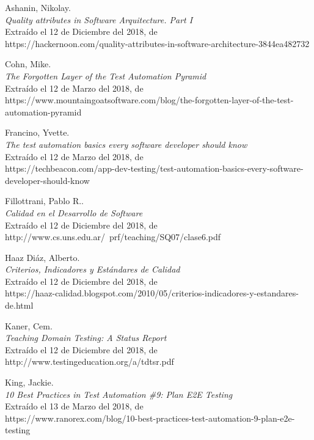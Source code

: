 \begin{thebibliography}{99}

 Ashanin, Nikolay.\\ %
\emph{Quality attributes in Software Arquitecture. Part I}\\
Extraído el 12 de Diciembre del 2018, de\\
https://hackernoon.com/quality-attributes-in-software-architecture-3844ea482732

 Cohn, Mike.\\
\emph{The Forgotten Layer of the Test Automation Pyramid}\\
Extraído el 12 de Marzo del 2018, de\\
https://www.mountaingoatsoftware.com/blog/the-forgotten-layer-of-the-test-automation-pyramid

 Francino, Yvette.\\
\emph{The test automation basics every software developer should know}\\
Extraído el 12 de Marzo del 2018, de\\
https://techbeacon.com/app-dev-testing/test-automation-basics-every-software-developer-should-know

 Fillottrani, Pablo R..\\ %
\emph{Calidad en el Desarrollo de Software}\\
Extraído el 12 de Diciembre del 2018, de\\
http://www.cs.uns.edu.ar/~prf/teaching/SQ07/clase6.pdf

 Haaz Diáz, Alberto.\\ %
\emph{Criterios, Indicadores y Estándares de Calidad}\\
Extraído el 12 de Diciembre del 2018, de\\
https://haaz-calidad.blogspot.com/2010/05/criterios-indicadores-y-estandares-de.html

 Kaner, Cem.\\ %
\emph{Teaching Domain Testing: A Status Report}\\
Extraído el 12 de Diciembre del 2018, de\\
http://www.testingeducation.org/a/tdtsr.pdf

 King, Jackie.\\
\emph{10 Best Practices in Test Automation \#9: Plan E2E Testing}\\
Extraído el 13 de Marzo del 2018, de\\
https://www.ranorex.com/blog/10-best-practices-test-automation-9-plan-e2e-testing


\end{thebibliography}
